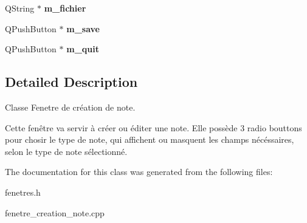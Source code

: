 \begin{DoxyCompactItemize}
\mbox{\label{classfenetre__creation__note_ada8843b6be5dd2dff4d99fade6bfada4}} 
Q\+String $\ast$ {\bfseries m\+\_\+fichier}
\item 
\mbox{\label{classfenetre__creation__note_adfe8b007cfc3075e77c3a1030571cbf5}} 
Q\+Push\+Button $\ast$ {\bfseries m\+\_\+save}
\item 
\mbox{\label{classfenetre__creation__note_ab3d04eb71646774146d2c12e8f0a53ec}} 
Q\+Push\+Button $\ast$ {\bfseries m\+\_\+quit}
\end{DoxyCompactItemize}


\subsection{Detailed Description}
Classe Fenetre de création de note. 

Cette fenêtre va servir à créer ou éditer une note. Elle possède 3 radio bouttons pour chosir le type de note, qui affichent ou masquent les champs nécéssaires, selon le type de note sélectionné. 

The documentation for this class was generated from the following files\+:\begin{DoxyCompactItemize}
\item 
fenetres.\+h\item 
fenetre\+\_\+creation\+\_\+note.\+cpp\end{DoxyCompactItemize}
